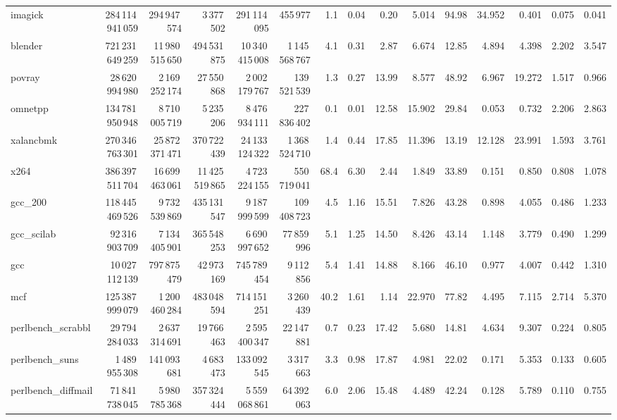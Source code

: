 \documentclass[9pt,landscape,a4paper]{article}
\begin{document}
\begin{adjustbox}{max width=\textwidth, max totalheight=0.50\textheight}
\begin{tabular}{lrrrrrrrrrrrrrr}
imagick & 284\,114\,941\,059 & 294\,947\,574 & 3\,377\,502 & 291\,114\,095 & 455\,977 & 1.1 & 0.04 & 0.20 & 5.014 & 94.98 & 34.952 & 0.401 & 0.075 & 0.041 \\
blender & 721\,231\,649\,259 & 11\,980\,515\,650 & 494\,531\,875 & 10\,340\,415\,008 & 1\,145\,568\,767 & 4.1 & 0.31 & 2.87 & 6.674 & 12.85 & 4.894 & 4.398 & 2.202 & 3.547 \\
povray & 28\,620\,994\,980 & 2\,169\,252\,174 & 27\,550\,868 & 2\,002\,179\,767 & 139\,521\,539 & 1.3 & 0.27 & 13.99 & 8.577 & 48.92 & 6.967 & 19.272 & 1.517 & 0.966 \\
omnetpp & 134\,781\,950\,948 & 8\,710\,005\,719 & 5\,235\,206 & 8\,476\,934\,111 & 227\,836\,402 & 0.1 & 0.01 & 12.58 & 15.902 & 29.84 & 0.053 & 0.732 & 2.206 & 2.863 \\
xalancbmk & 270\,346\,763\,301 & 25\,872\,371\,471 & 370\,722\,439 & 24\,133\,124\,322 & 1\,368\,524\,710 & 1.4 & 0.44 & 17.85 & 11.396 & 13.19 & 12.128 & 23.991 & 1.593 & 3.761 \\
x264 & 386\,397\,511\,704 & 16\,699\,463\,061 & 11\,425\,519\,865 & 4\,723\,224\,155 & 550\,719\,041 & 68.4 & 6.30 & 2.44 & 1.849 & 33.89 & 0.151 & 0.850 & 0.808 & 1.078 \\
gcc\_200 & 118\,445\,469\,526 & 9\,732\,539\,869 & 435\,131\,547 & 9\,187\,999\,599 & 109\,408\,723 & 4.5 & 1.16 & 15.51 & 7.826 & 43.28 & 0.898 & 4.055 & 0.486 & 1.233 \\
gcc\_scilab & 92\,316\,903\,709 & 7\,134\,405\,901 & 365\,548\,253 & 6\,690\,997\,652 & 77\,859\,996 & 5.1 & 1.25 & 14.50 & 8.426 & 43.14 & 1.148 & 3.779 & 0.490 & 1.299 \\
gcc & 10\,027\,112\,139 & 797\,875\,479 & 42\,973\,169 & 745\,789\,454 & 9\,112\,856 & 5.4 & 1.41 & 14.88 & 8.166 & 46.10 & 0.977 & 4.007 & 0.442 & 1.310 \\
mcf & 125\,387\,999\,079 & 1\,200\,460\,284 & 483\,048\,594 & 714\,151\,251 & 3\,260\,439 & 40.2 & 1.61 & 1.14 & 22.970 & 77.82 & 4.495 & 7.115 & 2.714 & 5.370 \\
perlbench\_scrabbl & 29\,794\,284\,033 & 2\,637\,314\,691 & 19\,766\,463 & 2\,595\,400\,347 & 22\,147\,881 & 0.7 & 0.23 & 17.42 & 5.680 & 14.81 & 4.634 & 9.307 & 0.224 & 0.805 \\
perlbench\_suns & 1\,489\,955\,308 & 141\,093\,681 & 4\,683\,473 & 133\,092\,545 & 3\,317\,663 & 3.3 & 0.98 & 17.87 & 4.981 & 22.02 & 0.171 & 5.353 & 0.133 & 0.605 \\
perlbench\_diffmail & 71\,841\,738\,045 & 5\,980\,785\,368 & 357\,324\,444 & 5\,559\,068\,861 & 64\,392\,063 & 6.0 & 2.06 & 15.48 & 4.489 & 42.24 & 0.128 & 5.789 & 0.110 & 0.755 \\

\end{tabular}
\end{adjustbox}
\end{document}

